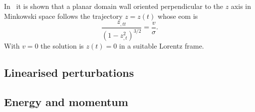 In~\citet{garrigaPerturbationsDomainWalls1991} it is shown that a planar domain wall oriented perpendicular to the $z$ axis in Minkowski space follows the trajectory $z=z(t)$ whose eom is 
\begin{equation}
    \frac{z_{,tt}}{{(1-z_{,t}^2)}^{3/2}} = \frac{v}{\sigma}.
\end{equation}
With $v=0$ the solution is $z(t)=0$ in a suitable Lorentz frame. 




\subsection{Linearised perturbations}\label{sec:pertwalls:eom_wall:linearised_pert}




\hlineSep














\subsection{Energy and momentum}
    
